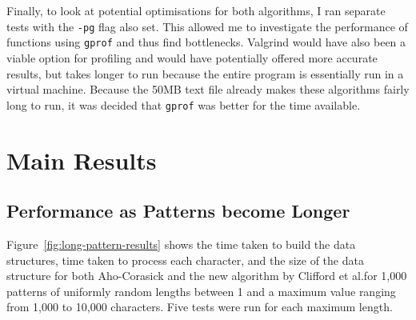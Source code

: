 \documentclass[ %
                    author={Dominic Joseph Moylett},
                    degree={MEng},
                     title={Dictionary Matching with Fingerprints},
                  subtitle={An Empirical Analysis},
                      type={research},
                      year={2015} ]{dissertation}
\begin{document}
Finally, to look at potential optimisations for both algorithms, I ran separate tests with the \texttt{-pg} flag also set. This allowed me to investigate the performance of functions using \texttt{gprof} and thus find bottlenecks. Valgrind would have also been a viable option for profiling and would have potentially offered more accurate results, but takes longer to run because the entire program is essentially run in a virtual machine. Because the 50MB text file already makes these algorithms fairly long to run, it was decided that \texttt{gprof} was better for the time available.

\section{Main Results}

\subsection{Performance as Patterns become Longer}
\label{ssec:long-pattern-results}

Figure~\ref{fig:long-pattern-results} shows the time taken to build the data structures, time taken to process each character, and the size of the data structure for both Aho-Corasick and the new algorithm by Clifford et al.\@ for 1,000 patterns of uniformly random lengths between 1 and a maximum value ranging from 1,000 to 10,000 characters. Five tests were run for each maximum length.
\end{document}
